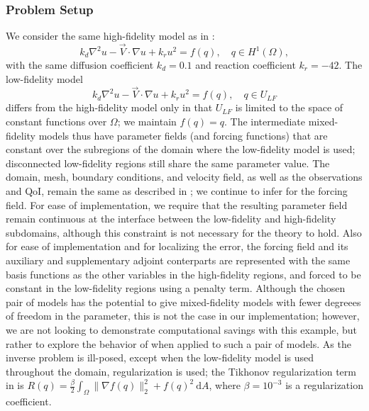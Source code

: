 \subsubsection{Problem Setup}

We consider the same high-fidelity model as in :
\begin{equation}
k_d\nabla^2 u - \vec{V}\cdot\nabla u + k_ru^2= f(q),\quad q\in H^1(\Omega),
\end{equation}
with the same diffusion coefficient $k_d = 0.1$  and reaction coefficient $k_r = -42$. The low-fidelity model
\begin{equation}
k_d\nabla^2 u - \vec{V}\cdot\nabla u + k_ru^2= f(q),\quad q\in U_{LF}
\end{equation}
differs from the high-fidelity model only in that $U_{LF}$ is limited to the space of constant functions over $\Omega$; we maintain $f(q)=q$. The intermediate mixed-fidelity models thus have parameter fields (and forcing functions) that are constant over the subregions of the domain where the low-fidelity model is used; disconnected low-fidelity regions still share the same parameter value. The domain, mesh, boundary conditions, and velocity field, as well as the observations and QoI, remain the same as described in ; we continue to infer for the forcing field. For ease of implementation, we require that the resulting parameter field remain continuous at the interface between the low-fidelity and high-fidelity subdomains, although this constraint is not necessary for the theory to hold. Also for ease of implementation and for localizing the error, the forcing field and its auxiliary and supplementary adjoint conterparts are represented with the same basis functions as the other variables in the high-fidelity regions, and forced to be constant in the low-fidelity regions using a penalty term. Although the chosen pair of models has the potential to give mixed-fidelity models with fewer degreees of freedom in the parameter, this is not the case in our implementation; however, we are not looking to demonstrate computational savings with this example, but rather to explore the behavior of  when applied to such a pair of models. As the inverse problem is ill-posed, except when the low-fidelity model is used throughout the domain, regularization is used; the Tikhonov regularization term in  is $R(q)=\frac{\beta}{2}\int_\Omega \|\nabla f(q)\|_2^2+f(q)^2\:\textrm{d}A$, where $\beta=10^{-3}$ is a regularization coefficient. 

